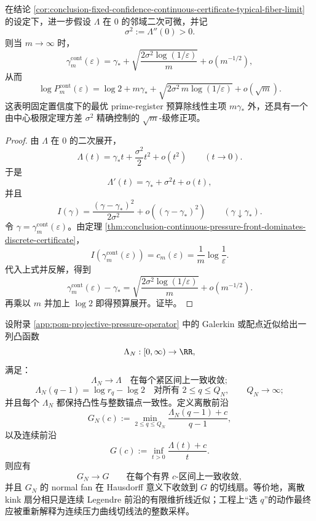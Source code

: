 \begin{theorem}[固定置信度下连续证书预算的平方根修正律]\label{thm:conclusion-fixed-confidence-continuous-certificate-sqrtm-correction}
在结论 \ref{cor:conclusion-fixed-confidence-continuous-certificate-typical-fiber-limit} 的设定下，进一步假设 \(\Lambda\) 在 \(0\) 的邻域二次可微，并记
\[
\sigma^2:=\Lambda''(0)>0.
\]
则当 \(m\to\infty\) 时，
\[
\gamma_m^{\mathrm{cont}}(\varepsilon)
=
\gamma_{\ast}
+
\sqrt{\frac{2\sigma^2\log(1/\varepsilon)}{m}}
+
o(m^{-1/2}),
\]
从而
\[
\log P_m^{\mathrm{cont}}(\varepsilon)
=
\log 2 + m\gamma_{\ast}
+
\sqrt{2\sigma^2\,m\log(1/\varepsilon)}
+
o(\sqrt m).
\]
这表明固定置信度下的最优 prime-register 预算除线性主项 \(m\gamma_{\ast}\) 外，还具有一个由中心极限定理方差 \(\sigma^2\) 精确控制的 \(\sqrt m\)-级修正项。
\end{theorem}
\begin{proof}
由 \(\Lambda\) 在 \(0\) 的二次展开，
\[
\Lambda(t)=\gamma_{\ast}t+\frac{\sigma^2}{2}t^2+o(t^2)
\qquad (t\to 0).
\]
于是
\[
\Lambda'(t)=\gamma_{\ast}+\sigma^2 t+o(t),
\]
并且
\[
I(\gamma)=\frac{(\gamma-\gamma_{\ast})^2}{2\sigma^2}
+o\!\left((\gamma-\gamma_{\ast})^2\right)
\qquad (\gamma\downarrow\gamma_{\ast}).
\]
令 \(\gamma=\gamma_m^{\mathrm{cont}}(\varepsilon)\)。由定理 \ref{thm:conclusion-continuous-pressure-front-dominates-discrete-certificate}，
\[
I(\gamma_m^{\mathrm{cont}}(\varepsilon))=c_m(\varepsilon)=\frac1m\log\frac1\varepsilon.
\]
代入上式并反解，得到
\[
\gamma_m^{\mathrm{cont}}(\varepsilon)-\gamma_{\ast}
=
\sqrt{\frac{2\sigma^2\log(1/\varepsilon)}{m}}
+
o(m^{-1/2}).
\]
再乘以 \(m\) 并加上 \(\log 2\) 即得预算展开。证毕。
\end{proof}







\begin{conjecture}\label{conj:conclusion-discrete-kink-normal-fan-hausdorff-to-continuous-legendre}
设附录 \ref{app:pom-projective-pressure-operator} 中的 Galerkin 或配点近似给出一列凸函数
\[
\Lambda_N:[0,\infty)\to\RR,
\]
满足：
\[
\Lambda_N\to\Lambda\quad\text{在每个紧区间上一致收敛};
\]
\[
\Lambda_N(q-1)=\log r_q-\log 2
\quad\text{对所有 }2\le q\le Q_N,\qquad Q_N\to\infty;
\]
并且每个 \(\Lambda_N\) 都保持凸性与整数锚点一致性。定义离散前沿
\[
G_N(c):=\min_{2\le q\le Q_N}\frac{\Lambda_N(q-1)+c}{q-1},
\]
以及连续前沿
\[
G(c):=\inf_{t>0}\frac{\Lambda(t)+c}{t}.
\]
则应有
\[
G_N\to G
\qquad\text{在每个有界 \(c\)-区间上一致收敛},
\]
并且 \(G_N\) 的 normal fan 在 Hausdorff 意义下收敛到 \(G\) 的切线扇。等价地，离散 kink 扇分相只是连续 Legendre 前沿的有限维折线近似；工程上“选 \(q\)”的动作最终应被重新解释为连续压力曲线切线法的整数采样。
\end{conjecture}
